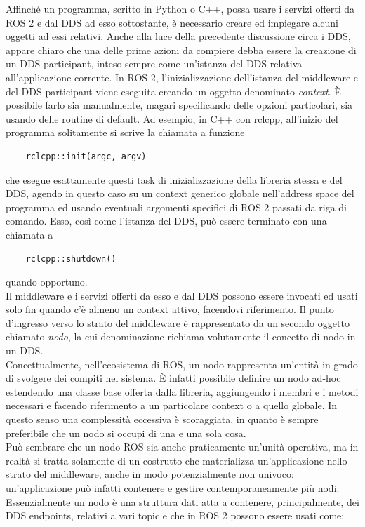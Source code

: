 \indent Affinché un programma, scritto in Python o C++, possa usare i servizi offerti da ROS 2 e dal DDS ad esso sottostante, è necessario creare ed impiegare alcuni oggetti ad essi relativi. Anche alla luce della precedente discussione circa i DDS, appare chiaro che una delle prime azioni da compiere debba essere la creazione di un DDS participant, inteso sempre come un'istanza del DDS relativa all'applicazione corrente. In ROS 2, l'inizializzazione dell'istanza del middleware e del DDS participant viene eseguita creando un oggetto denominato \emph{context}. È possibile farlo sia manualmente, magari specificando delle opzioni particolari, sia usando delle routine di default. Ad esempio, in C++ con rclcpp, all'inizio del programma solitamente si scrive la chiamata a funzione
\begin{verbatim}
    rclcpp::init(argc, argv)
\end{verbatim}
che esegue esattamente questi task di inizializzazione della libreria stessa e del DDS, agendo in questo caso su un context generico globale nell'address space del programma ed usando eventuali argomenti specifici di ROS 2 passati da riga di comando. Esso, così come l'istanza del DDS, può essere terminato con una chiamata a
\begin{verbatim}
    rclcpp::shutdown()
\end{verbatim}
quando opportuno.\\
Il middleware e i servizi offerti da esso e dal DDS possono essere invocati ed usati solo fin quando c'è almeno un context attivo, facendovi riferimento. Il punto d'ingresso verso lo strato del middleware è rappresentato da un secondo oggetto chiamato \emph{nodo}, la cui denominazione richiama volutamente il concetto di nodo in un DDS.\\
Concettualmente, nell'ecosistema di ROS, un nodo rappresenta un'entità in grado di svolgere dei compiti nel sistema. È infatti possibile definire un nodo ad-hoc estendendo una classe base offerta dalla libreria, aggiungendo i membri e i metodi necessari e facendo riferimento a un particolare context o a quello globale. In questo senso una complessità eccessiva è scoraggiata, in quanto è sempre preferibile che un nodo si occupi di una e una sola cosa.\\
Può sembrare che un nodo ROS sia anche praticamente un'unità operativa, ma in realtà si tratta solamente di un costrutto che materializza un'applicazione nello strato del middleware, anche in modo potenzialmente non univoco: un'applicazione può infatti contenere e gestire contemporaneamente più nodi. Essenzialmente un nodo è una struttura dati atta a contenere, principalmente, dei DDS endpoints, relativi a vari topic e che in ROS 2 possono essere usati come:

